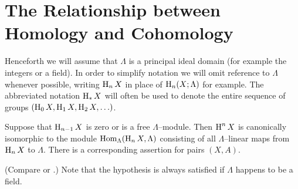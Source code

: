 \documentclass[../main]{subfiles}
\begin{document}
\section{The Relationship between Homology and Cohomology}
Henceforth we will assume that $\Lambda$ is a principal ideal domain (for example the integers or a field). In order to simplify notation we will omit reference to $\Lambda$ whenever possible, writing $\operatorname{H}_n X$ in place of $\operatorname{H}_n(X; \Lambda)$ for example. The abbreviated notation $\operatorname{H}_\ast X$ will often be used to denote the entire sequence of groups $(\operatorname{H}_0 X, \operatorname{H}_1 X, \operatorname{H}_2 X, \ldots)$.

\begin{theorem}\label{thm:A.1}
Suppose that $\operatorname{H}_{n - 1} X$ is zero or is a free $\Lambda$--module. Then $\operatorname{H}^n X$ is canonically isomorphic to the module $\operatorname{Hom}_\Lambda(\operatorname{H}_n X, \Lambda)$ consisting of all $\Lambda$--linear maps from $\operatorname{H}_n X$ to $\Lambda$. There is a corresponding assertion for pairs $(X, A)$.
\end{theorem}

(Compare \cite[p. 77]{maclane_1975} or \cite[p. 243]{spanier1981}.) Note that the hypothesis is always satisfied if $\Lambda$ happens to be a field. 
\end{document}
